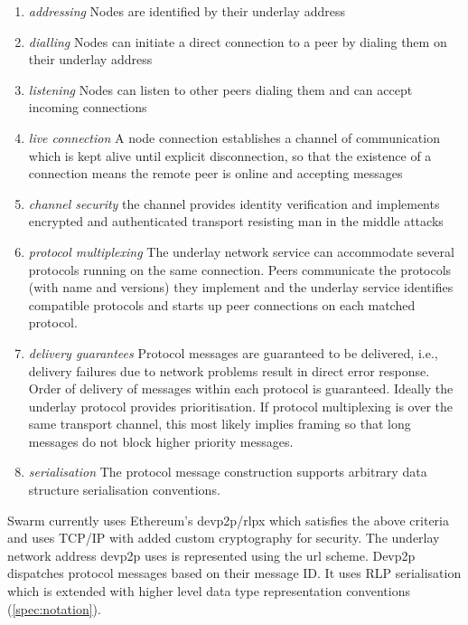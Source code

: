 \begin{enumerate}
    \item \emph{addressing} Nodes are identified by their underlay address
    \item \emph{dialling} Nodes can initiate a direct connection to a peer by dialing them on their underlay address
    \item \emph{listening} Nodes can listen to other peers dialing them and can accept incoming connections
    \item \emph{live connection} A node connection establishes a channel of communication which is kept alive until explicit disconnection, so that the existence of a connection means the remote peer is online and accepting messages
    \item \emph{channel security} 
    the channel provides identity verification and implements encrypted and authenticated transport resisting man in the middle attacks
    \item \emph{protocol multiplexing} 
    The underlay network service can accommodate several protocols running on the same connection. Peers communicate the protocols (with name and versions) they implement and the underlay service identifies compatible protocols and starts up peer connections on each matched protocol. 
    \item \emph{delivery guarantees}
    Protocol messages are guaranteed to be delivered, i.e., delivery failures due to network problems result in direct error response. 
    Order of delivery of messages within each protocol is guaranteed. 
    Ideally the underlay protocol provides prioritisation. 
    If protocol multiplexing is over the same transport channel, this most likely implies framing so that long messages do not block higher priority messages.
    \item \emph{serialisation} 
    The protocol message construction supports arbitrary data structure serialisation conventions.
    
\end{enumerate}

Swarm currently uses Ethereum's devp2p/rlpx which satisfies the above criteria and uses TCP/IP with added custom cryptography for security. The underlay network address devp2p uses is represented using the  url scheme. Devp2p dispatches protocol messages based on their message ID. It uses RLP serialisation which is extended with higher level data type representation conventions (\ref{spec:notation}). 

